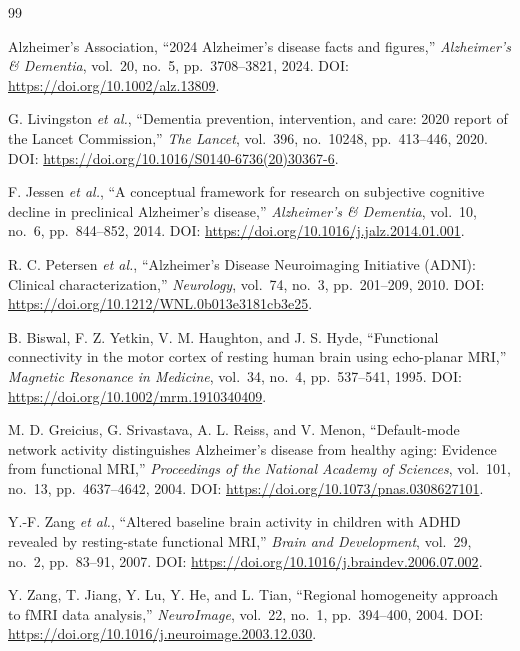 \documentclass{ssnreview}
\begin{document}
\begin{thebibliography}{99}

 Alzheimer's Association, ``2024 Alzheimer's disease facts and figures,'' \textit{Alzheimer's \& Dementia}, vol.~20, no.~5, pp.~3708--3821, 2024. DOI: \url{https://doi.org/10.1002/alz.13809}.

 G. Livingston \textit{et al.}, ``Dementia prevention, intervention, and care: 2020 report of the Lancet Commission,'' \textit{The Lancet}, vol.~396, no.~10248, pp.~413--446, 2020. DOI: \url{https://doi.org/10.1016/S0140-6736(20)30367-6}.

 F. Jessen \textit{et al.}, ``A conceptual framework for research on subjective cognitive decline in preclinical Alzheimer's disease,'' \textit{Alzheimer's \& Dementia}, vol.~10, no.~6, pp.~844--852, 2014. DOI: \url{https://doi.org/10.1016/j.jalz.2014.01.001}.

 R. C. Petersen \textit{et al.}, ``Alzheimer's Disease Neuroimaging Initiative (ADNI): Clinical characterization,'' \textit{Neurology}, vol.~74, no.~3, pp.~201--209, 2010. DOI: \url{https://doi.org/10.1212/WNL.0b013e3181cb3e25}.

 B. Biswal, F. Z. Yetkin, V. M. Haughton, and J. S. Hyde, ``Functional connectivity in the motor cortex of resting human brain using echo-planar MRI,'' \textit{Magnetic Resonance in Medicine}, vol.~34, no.~4, pp.~537--541, 1995. DOI: \url{https://doi.org/10.1002/mrm.1910340409}.

 M. D. Greicius, G. Srivastava, A. L. Reiss, and V. Menon, ``Default-mode network activity distinguishes Alzheimer's disease from healthy aging: Evidence from functional MRI,'' \textit{Proceedings of the National Academy of Sciences}, vol.~101, no.~13, pp.~4637--4642, 2004. DOI: \url{https://doi.org/10.1073/pnas.0308627101}.

 Y.-F. Zang \textit{et al.}, ``Altered baseline brain activity in children with ADHD revealed by resting-state functional MRI,'' \textit{Brain and Development}, vol.~29, no.~2, pp.~83--91, 2007. DOI: \url{https://doi.org/10.1016/j.braindev.2006.07.002}.

 Y. Zang, T. Jiang, Y. Lu, Y. He, and L. Tian, ``Regional homogeneity approach to fMRI data analysis,'' \textit{NeuroImage}, vol.~22, no.~1, pp.~394--400, 2004. DOI: \url{https://doi.org/10.1016/j.neuroimage.2003.12.030}.


\end{thebibliography}
\end{document}
